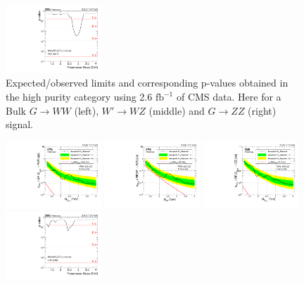 \begin{figure}[h!]
\includegraphics[width=0.32\textwidth]{figures/analysis/search1/AN-15-211/pvalues/pvalue_BulkZZinVVnew_high_purity.pdf}
\caption{Expected/observed limits and corresponding p-values obtained in the high purity category using 2.6 $\textrm{fb}^{-1}$ of CMS data. Here for a Bulk $G\rightarrow WW$ (left), $W'\rightarrow WZ$ (middle) and $G\rightarrow ZZ$ (right) signal.}
\label{fig:searchI:Limits_HP}
\end{figure}

\begin{figure}[h!]
\centering
\includegraphics[width=0.32\textwidth]{figures/analysis/search1/AN-15-211/limits/brazilianFlag_BulkWW_VVLP_new_combined_purity_13TeV_wPDF.pdf}
\includegraphics[width=0.32\textwidth]{figures/analysis/search1/AN-15-211/limits/brazilianFlag_WZ_VVLP_new_combined_purity_13TeV_wPDF.pdf}
\includegraphics[width=0.32\textwidth]{figures/analysis/search1/AN-15-211/limits/brazilianFlag_BulkZZ_VVLP_new_combined_purity_13TeV_wPDF.pdf}\\
\includegraphics[width=0.32\textwidth]{figures/analysis/search1/AN-15-211/pvalues/pvalue_BulkWWinVVnew_low_purity.pdf}

\end{figure}
